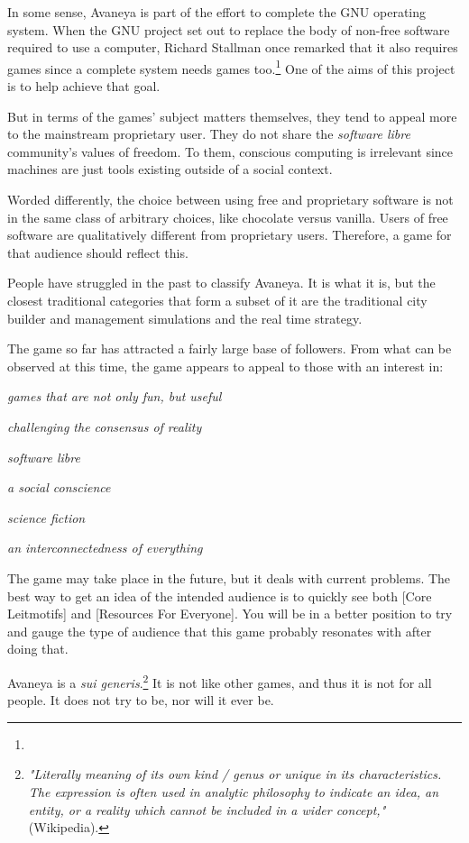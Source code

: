 In some sense, Avaneya is part of the effort to complete the GNU operating system. When the GNU project set out to replace the body of non-free software required to use a computer, Richard Stallman once remarked that it also requires games since a complete system needs games too.\footnote{} One of the aims of this project is to help achieve that goal.

But in terms of the games' subject matters themselves, they tend to appeal more to the mainstream proprietary user. They do not share the {\it software libre} community's values of freedom. To them, conscious computing is irrelevant since machines are just tools existing outside of a social context. 

Worded differently, the choice between using free and proprietary software is not in the same class of arbitrary choices, like chocolate versus vanilla. Users of free software are qualitatively different from proprietary users. Therefore, a game for that audience should reflect this.

People have struggled in the past to classify Avaneya. It is what it is, but the closest traditional categories that form a subset of it are the traditional city builder and management simulations and the real time strategy.

The game so far has attracted a fairly large base of followers. From what can be observed at this time, the game appears to appeal to those with an interest in:

\startitemize[3]
\item
{\it games that are not only fun, but useful}
\item
{\it challenging the consensus of reality}
\item
{\it software libre}
\item
{\it a social conscience}
\item
{\it science fiction}
\item
{\it an interconnectedness of everything}
\stopitemize

The game may take place in the future, but it deals with current problems. The best way to get an idea of the intended audience is to quickly see both [Core Leitmotifs] and [Resources For Everyone]. You will be in a better position to try and gauge the type of audience that this game probably resonates with after doing that. 

Avaneya is a {\it sui generis}.\footnote{{\it "Literally meaning of its own kind / genus or unique in its characteristics. The expression is often used in analytic philosophy to indicate an idea, an entity, or a reality which cannot be included in a wider concept,"} (Wikipedia).} It is not like other games, and thus it is not for all people. It does not try to be, nor will it ever be.

